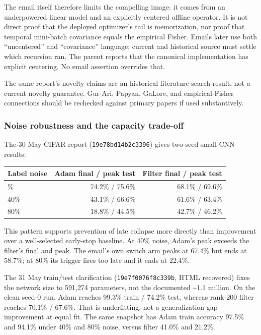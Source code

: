 \documentclass[
  british,
  10pt,
  a4paper,
]{article}
\newcounter{none} %
\begin{document}
The email itself therefore limits the compelling image: it comes from an
underpowered linear model and an explicitly centered offline operator.
It is not direct proof that the deployed optimizer's tail is
memorization\allowbreak{},\allowbreak{} nor proof that temporal
mini-batch covariance equals the empirical Fisher. Emails later use both
``uncentered'' and ``covariance'' language; current and historical
source must settle which recursion ran. The parent reports that the
canonical implementation has explicit centering. No email assertion
overrides that.

The same report's novelty claims are an historical
literature-\allowbreak{}search result, not a current novelty guarantee.
Gur-Ari, Papyan, GaLore, and empirical-\allowbreak{}Fisher connections
should be rechecked against primary papers if used
substantivel\allowbreak{}y.\allowbreak{}

\subsubsection{Noise robustness and the capacity
trade-off}\label{email-evidence--noise-robustness-and-the-capacity-trade-off}

The 30 May CIFAR report (\texttt{19e78bd14b2c\allowbreak{}3396}) gives
two-seed small-CNN results:

{\def\LTcaptype{none} %
\begin{longtable}[]{@{}lrr@{}}
\toprule\noalign{}
Label noise & Adam final / peak test & Filter final / peak test \\
\midrule\noalign{}
\endhead
\bottomrule\noalign{}
\endlastfoot
0\% & 74.2\% / 75.6\% & 68.1\% / 69.6\% \\
40\% & 43.1\% / 66.6\% & 61.6\% / 63.4\% \\
80\% & 18.8\% / 44.5\% & 42.7\% / 46.2\% \\
\end{longtable}
}

This pattern supports prevention of late collapse more directly than
improvement over a well-\allowbreak{}selected early-stop baseline. At
40\% noise, Adam's peak exceeds the filter's final and peak. The email's
own switch arm peaks at 67.4\% but ends at 58.7\%; at 80\% its trigger
fires too late and it ends at 22.4\%.

The 31 May train/test clarification
(\texttt{19e7f0076f8c\allowbreak{}339b}, HTML recovered) fixes the
network size to 591,274 parameters,\allowbreak{} not the documented
\textasciitilde1.1 million. On the clean seed-0 run, Adam reaches 99.3\%
train / 74.2\% test, whereas rank-200 filter reaches 70.1\% / 67.6\%.
That is underfitting\allowbreak{},\allowbreak{} not a
generalizati\allowbreak{}on-\allowbreak{}gap improvement at equal fit.
The same snapshot has Adam train accuracy 97.5\% and 94.1\% under 40\%
and 80\% noise, versus filter 41.0\% and 21.2\%.
\end{document}

